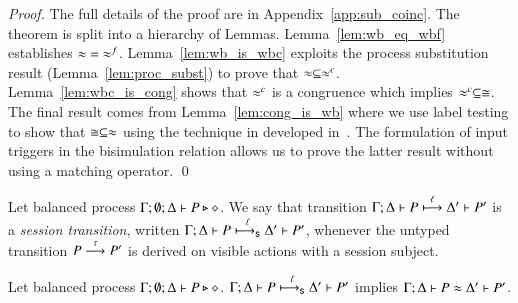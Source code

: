 \begin{proof}
	The full details of the proof are in Appendix~\ref{app:sub_coinc}.
	The theorem is split into a hierarchy of Lemmas. 
	Lemma~\ref{lem:wb_eq_wbf} establishes $\approx\ =\ \approx^{f}$.
	Lemma~\ref{lem:wb_is_wbc} exploits the process substitution result
	(Lemma~\ref{lem:proc_subst}) to prove that $\approx \subseteq \approx^{c}$.
	Lemma~\ref{lem:wbc_is_cong} shows that $\approx^{c}$ is a congruence
	which implies $\approx^{c} \subseteq \cong$.
	The final result comes from Lemma~\ref{lem:cong_is_wb} where
	we use label testing to show that $\cong \subseteq \approx$ using
	the technique in developed in~\cite{Hennessy07}. The formulation of input
	triggers in the bisimulation relation allows us to prove
	the latter result without using a matching operator.
	\qed
\end{proof}

%

\begin{definition}\rm
	Let balanced \HOp process $\Gamma; \emptyset; \Delta \vdash P \triangleright \diamond$.
	We say that transition
	$\Gamma; \Delta \vdash P \stackrel{\ell}{\longmapsto} \Delta' \vdash P'$ is
	a {\em session transition}, written
	$\Gamma; \Delta \vdash P \stackrel{\ell}{\longmapsto_{\mathsf{s}}} \Delta' \vdash P'$,
	whenever the untyped transition $P \stackrel{\tau}{\longrightarrow} P'$
	is derived on visible actions with a session subject.
\end{definition}

\begin{proposition}\rm
	\label{lem:tau_inert}
	Let balanced \HOp process $\Gamma; \emptyset; \Delta \vdash P \triangleright \diamond$.
	$\Gamma; \Delta \vdash P \stackrel{\ell}{\longmapsto_{\mathsf{s}}} \Delta' \vdash P'$ implies
	$\Gamma; \Delta \vdash P \approx \Delta' \vdash P'$.
\end{proposition}

